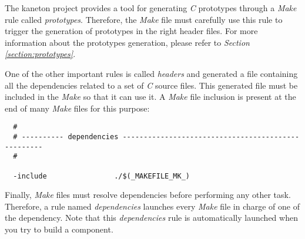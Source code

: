 The kaneton project provides a tool for generating \textit{C} prototypes
through a \textit{Make} rule called \textit{prototypes}. Therefore, the
\textit{Make} file must carefully use this rule to trigger the generation
of prototypes in the right header files. For more information about the
prototypes generation, please refer to \textit{Section
\ref{section:prototypes}}.

One of the other important rules is called \textit{headers} and generated
a file containing all the dependencies related to a set of \textit{C}
source files. This generated file must be included in the \textit{Make}
so that it can use it. A \textit{Make} file inclusion is present at the
end of many \textit{Make} files for this purpose:

\begin{verbatim}
  #
  # ---------- dependencies ---------------------------------------------------
  #

  -include                ./$(_MAKEFILE_MK_)
\end{verbatim}

Finally, \textit{Make} files must resolve dependencies before performing
any other task. Therefore, a rule named \textit{dependencies} launches
every \textit{Make} file in charge of one of the dependency. Note that this
\textit{dependencies} rule is automatically launched when you try to
build a component.
